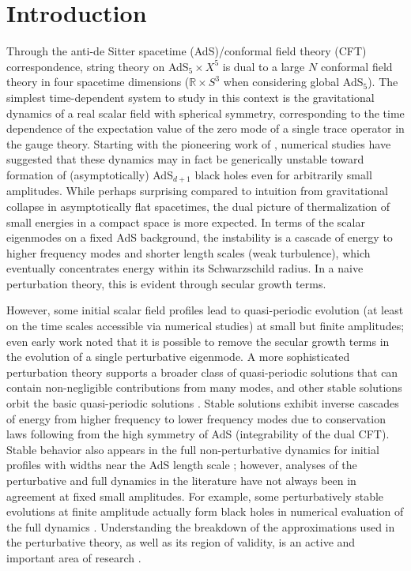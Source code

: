 \documentclass[../PhD.tex]{subfiles}
\begin{document}

\section{Introduction}

Through the anti-de Sitter spacetime (AdS)/conformal field theory (CFT)
correspondence, string theory on AdS$_5\times X^5$ is
dual to a large $N$ conformal field theory in four spacetime dimensions
($\mathbb{R}\times S^3$ when considering global AdS$_5$).  The simplest
time-dependent system to study in this context is the gravitational dynamics
of a real scalar field with spherical symmetry, corresponding to the
time dependence of the expectation value of the zero mode of a single
trace operator in the gauge theory.  Starting with the pioneering work of
\cite{1104.3702,1106.2339,1108.4539,1110.5823}, numerical studies have
suggested that these dynamics may in fact be generically unstable
toward formation of (asymptotically) AdS$_{d+1}$ black holes
even for arbitrarily small amplitudes.  While perhaps surprising compared
to intuition from gravitational collapse in asymptotically flat spacetimes,
the dual picture of thermalization of small energies in a compact space
is more expected.  In terms of the scalar eigenmodes on a fixed AdS background,
the instability is a cascade of energy to higher frequency modes and shorter
length scales (weak turbulence), which eventually concentrates energy within
its Schwarzschild radius.  In a naive perturbation theory, this is evident
through secular growth terms.

However, some initial scalar field profiles lead to quasi-periodic evolution
(at least on the time scales accessible via numerical studies)
at small but finite amplitudes; even early work \cite{1104.3702,1109.1825}
noted that it is possible to remove the secular growth terms in the
evolution of a single perturbative eigenmode.  A more sophisticated
perturbation theory \cite{1403.6471,1407.6273,Basu:2014sia,1410.1880,1412.4761,1412.3249,Evnin:2015gma,1507.02684,1507.08261,1508.04943,1508.05474,1510.07836}
supports a broader class of quasi-periodic solutions that can contain
non-negligible contributions from many modes, and other stable solutions
orbit the basic quasi-periodic solutions \cite{1507.08261}.  Stable
solutions exhibit inverse cascades of energy from higher frequency to lower
frequency modes due to conservation laws following from the high symmetry
of AdS (integrability of the dual CFT).  Stable behavior also appears
in the full non-perturbative dynamics for initial profiles with widths near
the AdS length scale \cite{1304.4166,1307.2875,1308.1235}; however,
analyses of the perturbative and full dynamics in the literature have not
always been in agreement at fixed small amplitudes.  For example, some
perturbatively stable evolutions at finite amplitude actually form black holes
in numerical evaluation of the full dynamics
\cite{1403.6471,1410.2631,1506.07907}.  Understanding the breakdown of the
approximations used in the perturbative theory, as well as its region of
validity, is an active and important area of research
\cite{1506.03519,1606.02712,1607.08094,Dimitrakopoulos:2016euh,1706.07413}.
\end{document}
